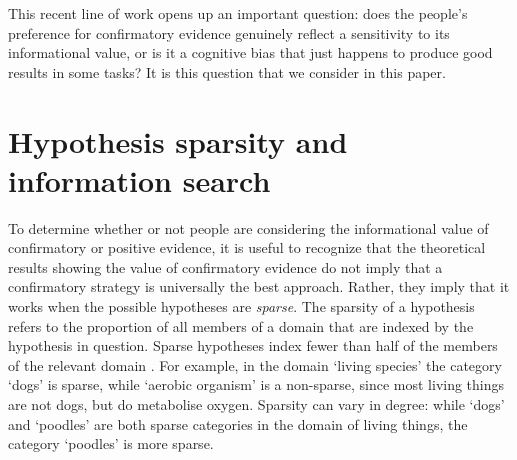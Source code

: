 \documentclass[10pt,letterpaper]{article}
\begin{document}
This recent line of work opens up an important question: does the people's preference for confirmatory evidence genuinely reflect a sensitivity to its informational value, or is it a cognitive bias that just happens to produce good results in some tasks? It is this question that we consider in this paper.


\section{Hypothesis sparsity and information search}

To determine whether or not people are considering the informational value of confirmatory or positive evidence, it is useful to recognize that the theoretical results showing the value of confirmatory evidence \cite{klayman1987confirmation,austerweil2011deterministic,navarro2011sparsecat} do not imply that a confirmatory strategy is %
 universally the best approach. Rather, they imply that it works when the possible hypotheses are {\it sparse}. The sparsity of a hypothesis refers to the proportion of all members of a domain that are indexed by the hypothesis in question. Sparse hypotheses index fewer than half of the members of the relevant domain \cite{navarro2011sparsecat}. For example, in the domain `living species' the category `dogs' is sparse, while `aerobic organism' is a non-sparse, since most living things are not dogs, but do metabolise oxygen. Sparsity can vary in degree: while `dogs' and `poodles' are both sparse categories in the domain of living things, the category `poodles' is more sparse. 


\end{document}

